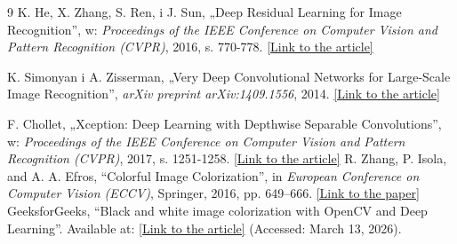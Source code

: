 \documentclass{article}
\begin{document}
\begin{thebibliography}{9}
    K. He, X. Zhang, S. Ren, i J. Sun, „Deep Residual Learning for Image Recognition”, w: \textit{Proceedings of the IEEE Conference on Computer Vision and Pattern Recognition (CVPR)}, 2016, s. 770-778. \href{https://arxiv.org/abs/1512.03385}{[Link to the article]}
    
    K. Simonyan i A. Zisserman, „Very Deep Convolutional Networks for Large-Scale Image Recognition”, \textit{arXiv preprint arXiv:1409.1556}, 2014. \href{https://arxiv.org/abs/1409.1556}{[Link to the article]}
    
    F. Chollet, „Xception: Deep Learning with Depthwise Separable Convolutions”, w: \textit{Proceedings of the IEEE Conference on Computer Vision and Pattern Recognition (CVPR)}, 2017, s. 1251-1258. \href{https://arxiv.org/abs/1610.02357}{[Link to the article]}
    R. Zhang, P. Isola, and A. A. Efros, ``Colorful Image Colorization'', in \textit{European Conference on Computer Vision (ECCV)}, Springer, 2016, pp. 649--666. \href{https://arxiv.org/abs/1603.08511}{[Link to the paper]}
    GeeksforGeeks, ``Black and white image colorization with OpenCV and Deep Learning''. Available at: \href{https://www.geeksforgeeks.org/computer-vision/black-and-white-image-colorization-with-opencv-and-deep-learning/}{[Link to the article]} (Accessed: March 13, 2026).
    
\end{thebibliography}
\end{document}

